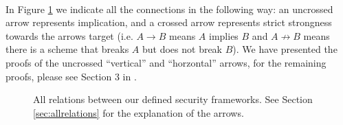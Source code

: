 \documentclass{article}
\theoremstyle{definition}
\theoremstyle{example}
\begin{document}
\paragraph{} In Figure \ref{fig:secrelations} we indicate all the connections in the following way:
an uncrossed arrow represents implication, and a crossed arrow represents strict
strongness towards the arrows target (i.e. $A \rightarrow B$ means $A$ implies
$B$ and $A \not\rightarrow B$ means there is a scheme that breaks $A$ but does
not break $B$). We have presented the proofs of the uncrossed ``vertical'' and
``horzontal'' arrows, for the remaining proofs, please see Section 3 in \cite{bellaresecurityrelations}.
\begin{figure}
  \centering
  \caption{All relations between our defined security frameworks. See Section
    \ref{sec:allrelations} for the explanation of the arrows.}
  \label{fig:secrelations}
\end{figure}
\end{document}
